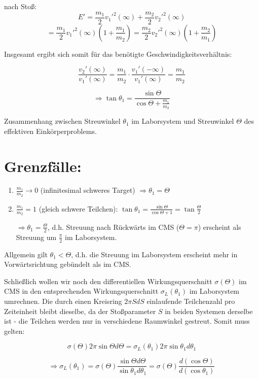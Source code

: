 \documentclass[10pt, letterpaper]{article}
\begin{document}
nach Stoß:
\[E' = \frac{m_1}{2}v_1'^2(\infty) + \frac{m_2}{2}v_2'^2(\infty)\]
\[= \frac{m_1}{2}v_1'^2(\infty)\left(1+\frac{m_1}{m_2}\right) = \frac{m_2}{2}v_2'^2(\infty)\left(1+\frac{m_2}{m_1}\right)\]

Insgesamt ergibt sich somit für das benötigte Geschwindigkeitsverhältnis:

\[\frac{v_2'(\infty)}{v_1'(\infty)} = \frac{m_1}{m_2}\cdot\frac{v_1'(-\infty)}{v_1'(\infty)} = \frac{m_1}{m_2}\]

\[\Rightarrow \tan\theta_1 = \frac{\sin\Theta}{\cos\Theta + \frac{m_1}{m_2}}\]

Zusammenhang zwischen Streuwinkel $\theta_1$ im Laborsystem und Streuwinkel $\Theta$ des effektiven Einkörperproblems.
\section*{Grenzfälle:}

\begin{enumerate}
\item $\frac{m_1}{m_2} \to 0$ (infinitesimal schweres Target) $\Rightarrow \theta_1 = \Theta$

\item $\frac{m_1}{m_2} = 1$ (gleich schwere Teilchen): $\tan \theta_1 = \frac{\sin \Theta}{\cos \Theta + 1} = \tan \frac{\Theta}{2}$

$\Rightarrow \theta_1 = \frac{\Theta}{2}$, d.h. Streuung nach Rückwärts im CMS ($\Theta = \pi$) erscheint als Streuung um $\frac{\pi}{2}$ im Laborsystem.
\end{enumerate}

Allgemein gilt $\theta_1 < \Theta$, d.h. die Streuung im Laborsystem erscheint mehr in Vorwärtsrichtung gebündelt als im CMS.

Schließlich wollen wir noch den differentiellen Wirkungsquerschnitt $\sigma(\Theta)$ im CMS in den entsprechenden Wirkungsquerschnitt $\sigma_L(\theta_1)$ im Laborsystem umrechnen. Die durch einen Kreisring $2\pi S dS$ einlaufende Teilchenzahl pro Zeiteinheit bleibt dieselbe, da der Stoßparameter $S$ in beiden Systemen derselbe ist - die Teilchen werden nur in verschiedene Raumwinkel gestreut. Somit muss gelten:

\[\sigma(\Theta) 2\pi \sin \Theta d\Theta = \sigma_L(\theta_1) 2\pi \sin \theta_1 d\theta_1\]

\[\Rightarrow \sigma_L(\theta_1) = \sigma(\Theta) \frac{\sin \Theta d\Theta}{\sin \theta_1 d\theta_1} = \sigma(\Theta) \frac{d(\cos \Theta)}{d(\cos \theta_1)}\]
\end{document}
